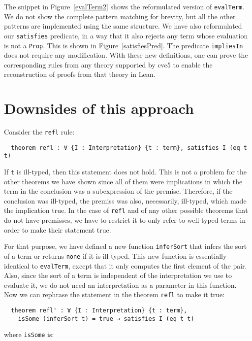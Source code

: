 The snippet in Figure~\ref{evalTerm2} shows the reformulated version of \texttt{evalTerm}.
We do not show the complete pattern matching for brevity, but all the other
patterns are implemented using the same structure.
We have also reformulated our \texttt{satisfies} predicate, in a way that
it also rejects any term whose evaluation is not a \texttt{Prop}. This is shown
in Figure~\ref{satisfiesPred}. The predicate \texttt{impliesIn} does not require
any modification. With these new definitions, one can prove the corresponding
rules from any theory supported by cvc5 to enable the reconstruction of
proofs from that theory in Lean.

\section{Downsides of this approach}\label{sec:downsides}

Consider the \texttt{refl} rule:

\begin{verbatim}
  theorem refl : ∀ {I : Interpretation} {t : term}, satisfies I (eq t t)
\end{verbatim}

If \texttt{t} is ill-typed, then this statement does not hold. This is not
a problem for the other theorems we have shown since all of them were implications in
which the term in the conclusion was a subexpression of the premise. Therefore,
if the conclusion was ill-typed, the premiss was also, necessarily, ill-typed,
which made the implication true. In the case of \texttt{refl} and of
any other possible theorems that do not have premisses, we have to restrict it
to only refer to well-typed terms in order to make their statement true.

For that purpose, we have defined a new function \texttt{inferSort} that infers the sort of a term
or returns \texttt{none} if it is ill-typed.
This new function is essentially identical to
\texttt{evalTerm}, except that it only computes the first element of the pair.
Also, since the sort of a term is independent of the interpretation we use
to evaluate it, we do not need an interpretation as a parameter in this function.
Now we can rephrase the statement in the theorem \texttt{refl} to make it true:

\begin{verbatim}
  theorem refl' : ∀ {I : Interpretation} {t : term},
    isSome (inferSort t) = true → satisfies I (eq t t)
\end{verbatim}
where \texttt{isSome} is:

